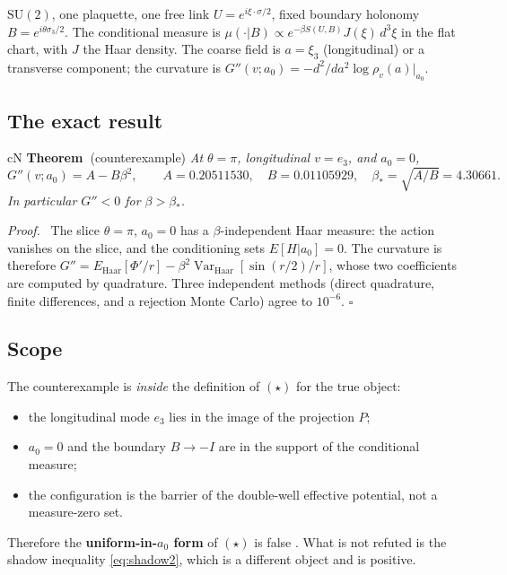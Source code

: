\documentclass[11pt,a4paper]{article}
\newcommand{\labb}[2]{\fcolorbox{#1!35}{#1!8}{\textcolor{#1}{\textbf{\scriptsize #2}}}}
\newcommand{\LN}{\labb{cN}{N}}
\newcounter{claim}
\newcommand{\claimhead}[2]{%
  \refstepcounter{claim}%
  \textbf{#1~\theclaim}#2\hspace{0.35em}\ignorespaces}
\newenvironment{proofx}{\par\noindent\emph{Proof.}\ }{\hfill$\square$\par\medskip}
\begin{document}
$\mathrm{SU}(2)$, one plaquette, one free link $U=e^{i\xi\cdot\sigma/2}$, fixed boundary holonomy
$B=e^{i\theta\sigma_3/2}$. The conditional measure is
$\mu(\cdot|B)\propto e^{-\beta S(U,B)}J(\xi)\,d^3\xi$ in the flat chart, with $J$ the Haar density.
The coarse field is $a=\xi_3$ (longitudinal) or a transverse component; the curvature is
$G''(v;a_0)=-d^2/da^2\log\rho_v(a)|_{a_0}$.

\subsection{The exact result}

\begin{claimbox}{cN}
\claimhead{Theorem}{(counterexample)} \emph{At $\theta=\pi$, longitudinal $v=e_3$, and $a_0=0$,}
\begin{equation}
G''(v;a_0)=A-B\beta^2,\qquad
A=0.20511530,\quad B=0.01105929,\quad \beta_*=\sqrt{A/B}=4.30661 .
\label{eq:counter}
\end{equation}
\emph{In particular $G''<0$ for $\beta>\beta_*$.}
\end{claimbox}

\begin{proofx}
The slice $\theta=\pi$, $a_0=0$ has a $\beta$-independent Haar measure: the action vanishes on the
slice, and the conditioning sets $E[H|a_0]=0$. The curvature is therefore
$G''=E_{\mathrm{Haar}}[\Phi'/r]-\beta^2\operatorname{Var}_{\mathrm{Haar}}[\sin(r/2)/r]$, whose two
coefficients are computed by quadrature. Three independent methods (direct quadrature, finite
differences, and a rejection Monte Carlo) agree to $10^{-6}$.
\end{proofx}

\subsection{Scope}

The counterexample is \emph{inside} the definition of $(\star)$ for the true object:
\begin{itemize}
\item the longitudinal mode $e_3$ lies in the image of the projection $P$;
\item $a_0=0$ and the boundary $B\to-I$ are in the support of the conditional measure;
\item the configuration is the barrier of the double-well effective potential, not a measure-zero
  set.
\end{itemize}
Therefore the \textbf{uniform-in-$a_0$ form} of $(\star)$ is false \LN. What is not refuted is the
shadow inequality \eqref{eq:shadow2}, which is a different object and is positive.
\end{document}
